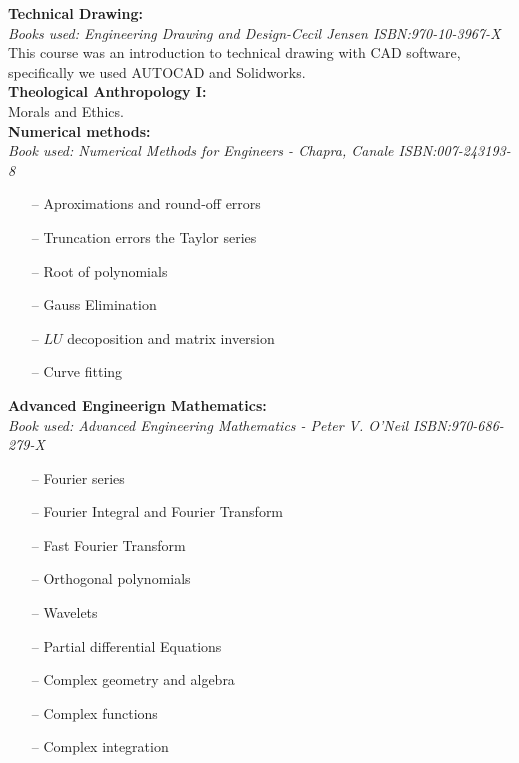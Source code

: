 \documentclass{article}
\begin{document}
\textbf{Technical Drawing:}\\
    \emph{Books used: Engineering Drawing and Design-Cecil Jensen ISBN:970-10-3967-X}\\
    This course was an introduction to technical drawing with CAD software, specifically we
    used AUTOCAD and Solidworks.\\

\textbf{Theological Anthropology I:}\\
    Morals and Ethics.\\


\textbf{Numerical methods:}\\
    \emph{Book used: Numerical Methods for Engineers - Chapra, Canale ISBN:007-243193-8}\\
    \begin{itemize}
     \setlength\itemsep{0pt}
    \item[--] Aproximations and round-off errors
    \item[--] Truncation errors the Taylor series
    \item[--] Root of polynomials
    \item[--] Gauss Elimination
    \item[--] $LU$ decoposition and matrix inversion
    \item[--] Curve fitting
    \end{itemize}

\textbf{Advanced Engineerign Mathematics:}\\
    \emph{Book used: Advanced Engineering Mathematics - Peter V. O'Neil  ISBN:970-686-279-X}
    \begin{itemize}
     \setlength\itemsep{0pt}
    \item[--] Fourier series
    \item[--] Fourier Integral and Fourier Transform
    \item[--] Fast Fourier Transform
    \item[--] Orthogonal polynomials 
    \item[--] Wavelets
    \item[--] Partial differential Equations
    \item[--] Complex geometry and algebra
    \item[--] Complex functions
    \item[--] Complex integration
    \end{itemize}
\end{document}
